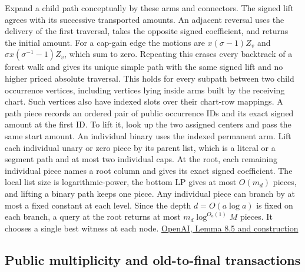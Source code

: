 \documentclass[11pt]{article}
\begin{document}
Expand a child path conceptually by these arms and connectors. The signed lift agrees with its successive transported amounts. An adjacent reversal uses the delivery of the first traversal, takes the opposite signed coefficient, and returns the initial amount. For a cap-gain edge the motions are \(x(\sigma-1)Z_v\) and \(\sigma x(\sigma^{-1}-1)Z_v\), which sum to zero. Repeating this erases every backtrack of a forest walk and gives its unique simple path with the same signed lift and no higher priced absolute traversal. This holds for every subpath between two child occurrence vertices, including vertices lying inside arms built by the receiving chart. Such vertices also have indexed slots over their chart-row mappings. A path piece records an ordered pair of public occurrence IDs and its exact signed amount at the first ID. To lift it, look up the two assigned centers and pass the same start amount. An individual binary uses the indexed permanent arm. Lift each individual unary or zero piece by its parent list, which is a literal or a segment path and at most two individual caps. At the root, each remaining individual piece names a root column and gives its exact signed coefficient. The local list size is logarithmic-power, the bottom LP gives at most \(O(m_d)\) pieces, and lifting a binary path keeps one piece. Any individual piece can branch by at most a fixed constant at each level. Since the depth \(d=O(a\log a)\) is fixed on each branch, a query at the root returns at most \(m_d\log^{O_a(1)}M\) pieces. It chooses a single best witness at each node. \href{https://raw.githubusercontent.com/openai/math/adc7f1241b42e322a6451854ab7e4b4c146bf78a/preprints/Almost-Linear-Time-Maximum-Cardinality-Matching-in-Sparse-General-Graphs-September-24-2026/main.pdf\#page=69}{OpenAI, Lemma 8.5 and construction}

\hypertarget{public-multiplicity-and-old-to-final-transactions}{%
\subsection{Public multiplicity and old-to-final transactions}\label{public-multiplicity-and-old-to-final-transactions}}
\end{document}
